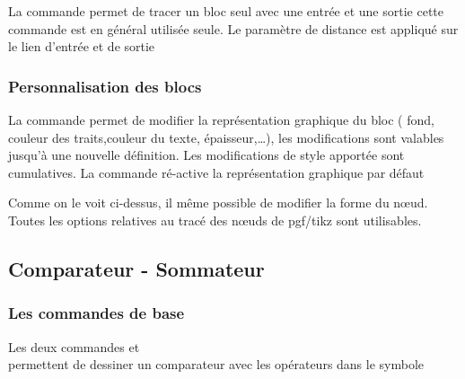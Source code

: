 \documentclass[a4paper,11pt]{article}                      %
\newcommand{\noeud}{n\oe ud}
\begin{document}
La commande   permet de tracer un bloc seul avec une entrée et une sortie cette commande est en général utilisée seule. Le paramètre de distance est appliqué sur le lien d'entrée et de sortie

\begin{tikzexample}[title=Commande ,   righthand width=0.45\textwidth,]
\end{tikzexample}

\subsubsection{Personnalisation des blocs}

La commande   permet de modifier la représentation graphique du bloc ( fond, couleur des traits,couleur du texte, épaisseur,\dots), les modifications sont valables jusqu'à une nouvelle définition. Les modifications de style apportée sont cumulatives. La commande \myverb{\sbStyleBlocDefaut}  ré-active la représentation graphique par défaut

\begin{tikzexample}[title=Personnalisation des blocs ,   righthand width=0.55\textwidth,]

\end{tikzexample}

Comme on le voit ci-dessus, il même possible de modifier la forme du \noeud. Toutes les options relatives au tracé des 
\noeud s   de  pgf/tikz sont utilisables.


\subsection{Comparateur - Sommateur}
\subsubsection{Les commandes de base}

 Les deux commandes 
   et \\
permettent de dessiner un comparateur avec les opérateurs dans le symbole
\end{document}
